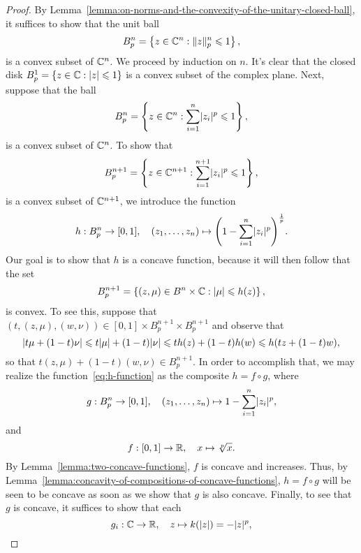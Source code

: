 \begin{proof}
  By Lemma~\ref{lemma:on-norms-and-the-convexity-of-the-unitary-closed-ball},
  it suffices to show that the unit ball
  \[
    B^{n}_{p}
    =
    \left\{z\in\complexfield^{n}:\norm<n>[p](z)\leqslant{1}\right\},
  \]
  is a convex subset of \(\mathbb{C}^{n}\). We proceed by induction on
  \(n\). It's clear that the closed disk
  \(B^{1}_{p}=\left\{z\in\mathbb{C}:\lvert z\rvert\leqslant{1}\right\}\) is a
  convex subset of the complex plane. Next, suppose that the ball
  \[
    B^{n}_{p}
    =
    \left\{z\in\mathbb{C}^{n}:\sum_{i=1}^{n}\lvert z_{i}\rvert^{p}\leqslant{1}\right\},
  \]
  is a convex subset of \(\mathbb{C}^{n}\). To show that
  \[
    B^{n+1}_{p}
    =
    \left\{z\in\mathbb{C}^{n+1}:\sum_{i=1}^{n+1}\lvert z_{i}\rvert^{p}\leqslant{1}\right\},
  \]
  is a convex subset of \(\mathbb{C}^{n+1}\), we introduce the function
  \begin{equation}\label{eq:h-function}
    h:B^{n}_{p}\to{[0,1]},
    \quad{(z_{1},\ldots,z_{n})\mapsto\left(1-\sum_{i=1}^{n}\lvert z_{i}\rvert^{p}\right)^{\frac{1}{p}}}.
  \end{equation}
  Our goal is to show that \(h\) is a concave function, because it will then follow that
  the set
  \[
    B^{n+1}_{p}
    =
    \left\{(z,\mu)\in{B^{n}\times\mathbb{C}}:\lvert\mu\rvert\leqslant{h(z)}\right\},
  \]
  is convex. To see this, suppose that
  \((t,(z,\mu),(w,\nu))\in{[0,1]\times{B^{n+1}_{p}}\times{B^{n+1}_{p}}}\) and
  observe that
  \[
    \lvert t\mu+(1-t)\nu\rvert
    \leqslant{t\lvert\mu\rvert+(1-t)\lvert\nu\rvert}
    \leqslant{th(z)+(1-t)h(w)}
    \leqslant{h(tz+(1-t)w}),
  \]
  so that \(t(z,\mu)+(1-t)(w,\nu)\in{B^{n+1}_{p}}\). In order to accomplish
  that, we may realize the function~\eqref{eq:h-function} as the composite
  \(h=f\circ{g}\), where
  \begin{equation}\label{eq:g-function}
    g:B^{n}_{p}\to[0,1],
    \quad{(z_{1},\ldots,z_{n})\mapsto{1-\sum_{i=1}^{n}\lvert z_{i}\rvert^{p}}},
  \end{equation}
  and
  \begin{equation}\label{eq:f-function}
    f:[0,1]\to\mathbb{R},\quad{x\mapsto{\sqrt[p]{x}}}.
  \end{equation}
  By Lemma~\ref{lemma:two-concave-functions}, \(f\) is concave and increases.
  Thus, by Lemma~\ref{lemma:concavity-of-compositions-of-concave-functions},
  \(h=f\circ{g}\) will be seen to be concave as soon as we show that \(g\) is
  also concave. Finally, to see that \(g\) is concave, it suffices to show that
  each
  \[
    g_{i}:\mathbb{C}\to\mathbb{R},\quad{z\mapsto{k(\lvert z\rvert)=-\lvert z\rvert^{p}}},
\]
\end{proof}
